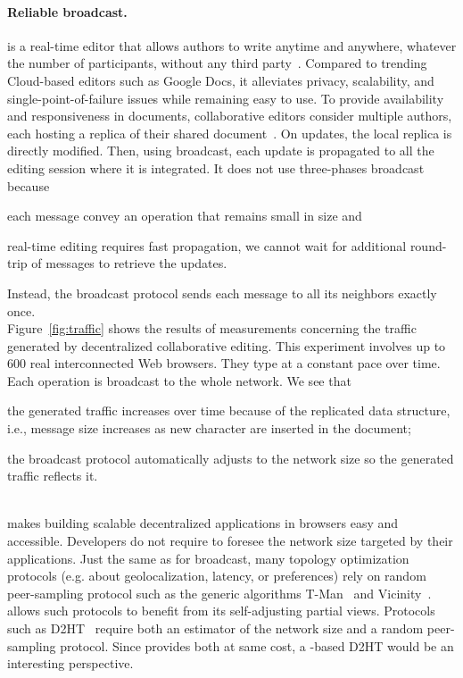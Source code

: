\paragraph{Reliable broadcast.} \CRATE is a real-time editor that allows authors
to write anytime and anywhere, whatever the number of participants, without any
third party~\cite{nedelec2016crate}. Compared to trending Cloud-based editors
such as Google Docs, it alleviates privacy, scalability, and
single-point-of-failure issues while remaining easy to use.  To provide
availability and responsiveness in documents, collaborative editors consider
multiple authors, each hosting a replica of their shared
document~\cite{saito2005optimistic}.  On updates, the local replica is directly
modified. Then, using broadcast, each update is propagated to all the editing
session where it is integrated.  It does not use three-phases broadcast because
\begin{inparaenum}[(i)]
\item each message convey an operation that remains small in size and
\item real-time editing requires fast propagation, we cannot wait for additional
  round-trip of messages to retrieve the updates.
\end{inparaenum} Instead, the broadcast protocol sends each message to all its
neighbors exactly once. \\
Figure~\ref{fig:traffic} shows the results of measurements concerning the
traffic generated by decentralized collaborative editing. This experiment
involves up to 600 real interconnected Web browsers. They type at a constant
pace over time. Each operation is broadcast to the whole network. We see that
\begin{inparaenum}
\item the generated traffic increases over time because of the replicated data
  structure, i.e., message size increases as new character are inserted in the
  document;
\item the broadcast protocol automatically adjusts to the network size so the
  generated traffic reflects it.
\end{inparaenum}

\ \\

\SPRAY makes building scalable decentralized applications in browsers easy and
accessible.  Developers do not require to foresee the network size targeted by
their applications. Just the same as for broadcast, many topology optimization
protocols (e.g. about geolocalization, latency, or preferences) rely on random
peer-sampling protocol such as the generic algorithms
T-Man~\cite{jelasity2009tman} and Vicinity~\cite{voulgaris2005epidemic}. \SPRAY
allows such protocols to benefit from its self-adjusting partial
views. Protocols such as D2HT~\cite{bertier-d2ht} require both an estimator of
the network size and a random peer-sampling protocol. Since \SPRAY provides both
at same cost, a \SPRAY-based D2HT would be an interesting perspective.

